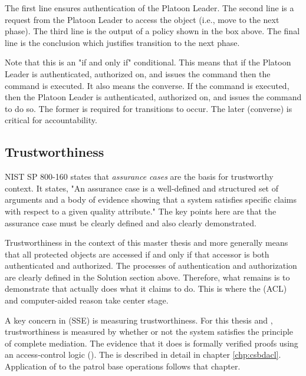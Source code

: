 \documentclass[../../main/main.tex]{subfiles}
\begin{document}

The first line ensures authentication of the Platoon Leader.  The second line is a request from the Platoon Leader to access the object (i.e., move to the next phase).  The third line is the output of a policy shown in the box above. The final line is the conclusion which justifies transition to the next phase.

Note that this is an "if and only if" conditional.  This means that if the Platoon Leader is authenticated, authorized on, and issues the command then the command is executed.  It also means the converse.  If the command is executed, then the Platoon Leader is authenticated, authorized on, and issues the command to do so.  The former is required for transitions to occur.  The later (converse) is critical for accountability.  

\subsection{Trustworthiness}
NIST SP 800-160 states that \textit{assurance cases} are the basis for trustworthy context.  It states, "An assurance case is a well-defined and structured set of arguments and a body of evidence showing that a system satisfies specific claims with respect to a given quality attribute." The key points here are that the assurance case must be clearly defined and also clearly demonstrated. 

Trustworthiness in the context of this master thesis and more generally  means that all protected objects are accessed if and only if that accessor is both authenticated and authorized.  The processes of authentication and authorization are clearly defined in the Solution section above.  Therefore, what remains is to demonstrate that actually does what it claims to do.  This is where the  (ACL) and computer-aided reason take center stage.  

A key concern in  (SSE) is measuring trustworthiness.  For this thesis and , trustworthiness is measured by whether or not the system satisfies the principle of complete mediation. The evidence that it does is formally verified proofs using an access-control logic ().  The  is described in detail in chapter \ref{chp:csbdacl}.  Application of  to the patrol base operations follows that chapter.    
\end{document}
